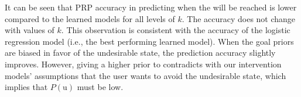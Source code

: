 It can be seen that PRP accuracy in predicting when the \undesired will be reached is lower compared to the learned models for all levels of $k$.
The accuracy does not change with values of $k$. 
This observation is consistent with the accuracy of the logistic regression model (i.e., the best performing learned model).
When the goal priors are biased in favor of the undesirable state, the prediction accuracy slightly improves. 
However, giving a higher prior to \undesired contradicts with our intervention models' assumptions that the user wants to avoid the undesirable state, which implies that $P(\mathrm{u})$ must be low.




\begin{table}[tpb]
%
\caption{Precision, Recall and F-scores for solving the r-UPSR problem as a Plan Recognition problem with the Probabilistic Plan Recognition as Planning algorithm.}
\label{tab:prp}
\end{table}


